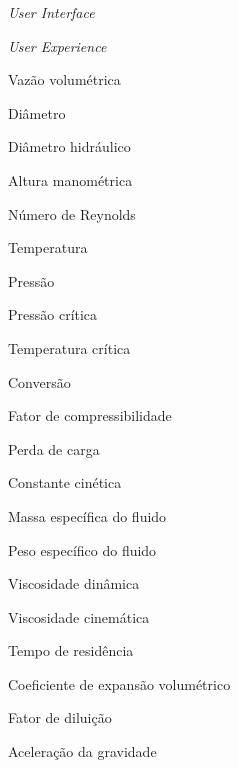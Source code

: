 \documentclass[
	12pt,				%
	openright,			%
	twoside,			%
	a4paper,			%
	english,			%
	brazil				%
	]{abntex2}
\begin{document}
\begin{siglas}
  \item[\textit{UI}] \textit{User Interface}
  \item[\textit{UX}] \textit{User Experience}
  \item[$Q$] Vazão volumétrica
  \item[$D$] Diâmetro
  \item[$D_h$] Diâmetro hidráulico
  \item[$H$] Altura manométrica
  \item[$Re$] Número de Reynolds
  \item[$T$] Temperatura
  \item[$P$] Pressão
  \item[$P_c$] Pressão crítica
  \item[$T_c$] Temperatura crítica
  \item[$X$] Conversão
  \item[$Z$] Fator de compressibilidade
  \item[$h_f$] Perda de carga
  \item[$k$] Constante cinética
  \item[$\rho$] Massa específica do fluido
  \item[$\gamma$] Peso específico do fluido
  \item[$\mu$] Viscosidade dinâmica
  \item[$\nu$] Viscosidade cinemática
  \item[$\tau$] Tempo de residência
  \item[$\varepsilon$] Coeficiente de expansão volumétrico
  \item[$\psi$] Fator de diluição
  \item[$g$] Aceleração da gravidade
\end{siglas}
\cleardoublepage

\tableofcontents*
\cleardoublepage


\hypersetup{pageanchor=true}
\textual



\let\origcleardoublepage\cleardoublepage
\let\origcleartorecto\cleartorecto
\let\cleardoublepage\clearpage
\let\cleartorecto\clearpage

\let\cleardoublepage\origcleardoublepage
\let\cleartorecto\origcleartorecto






\postextual


\end{document}
